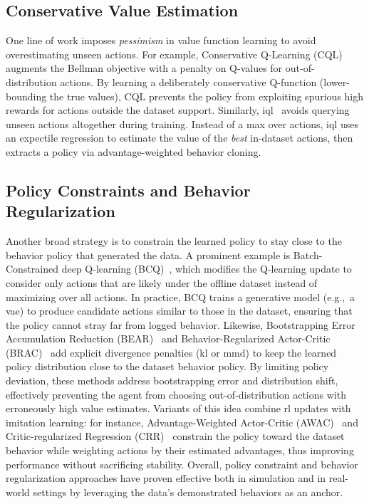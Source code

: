 \subsection{Conservative Value Estimation}\label{subsec:conservative-value-estimation}

One line of work imposes \textit{pessimism} in value function learning to avoid overestimating unseen actions.
For example, Conservative Q-Learning (CQL)~\cite{conservative} augments the Bellman objective with a penalty on Q-values for out-of-distribution actions.
By learning a deliberately conservative Q-function (lower-bounding the true values), CQL prevents the policy from exploiting spurious high rewards for actions outside the dataset support.
Similarly, \acrfull{iql}~\cite{kostrikov2022offline} avoids querying unseen actions altogether during training.
Instead of a max over actions, \acrshort{iql} uses an expectile regression to estimate the value of the \textit{best} in-dataset actions, then extracts a policy via advantage-weighted behavior cloning.

\subsection{Policy Constraints and Behavior Regularization}\label{subsec:policy-constraints-and-behavior-regularization}

Another broad strategy is to constrain the learned policy to stay close to the behavior policy that generated the data.
A prominent example is Batch-Constrained deep Q-learning (BCQ)~\cite{Fujimoto2018OffPolicyDR}, which modifies the Q-learning update to consider only actions that are likely under the offline dataset instead of maximizing over all actions.
In practice, BCQ trains a generative model (e.g.,\ a \acrfull{vae}) to produce candidate actions similar to those in the dataset, ensuring that the policy cannot stray far from logged behavior.
Likewise, Bootstrapping Error Accumulation Reduction (BEAR)~\cite{Kumar2019StabilizingOQ} and Behavior-Regularized Actor-Critic (BRAC)~\cite{Wu2019BehaviorRO} add explicit divergence penalties (\eg \acrfull{kl} or \acrfull{mmd}) to keep the learned policy distribution close to the dataset behavior policy.
By limiting policy deviation, these methods address bootstrapping error and distribution shift, effectively preventing the agent from choosing out-of-distribution actions with erroneously high value estimates.
Variants of this idea combine \acrshort{rl} updates with imitation learning: for instance, Advantage-Weighted Actor-Critic (AWAC)~\cite{Nair2020AcceleratingOR} and Critic-regularized Regression (CRR)~\cite{NEURIPS2020_588cb956} constrain the policy toward the dataset behavior while weighting actions by their estimated advantages, thus improving performance without sacrificing stability.
Overall, policy constraint and behavior regularization approaches have proven effective both in simulation and in real-world settings by leveraging the data’s demonstrated behaviors as an anchor.


